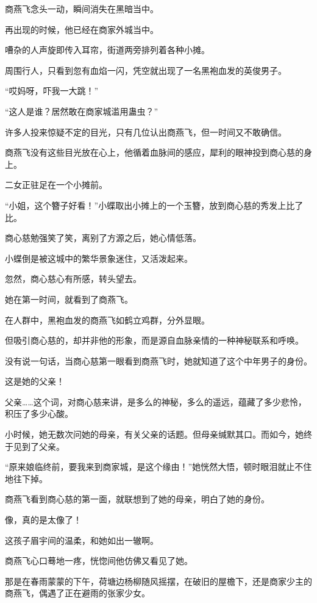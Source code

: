 
\begin{this_body}

商燕飞念头一动，瞬间消失在黑暗当中。

再出现的时候，他已经在商家外城当中。

嘈杂的人声旋即传入耳帘，街道两旁排列着各种小摊。

周围行人，只看到忽有血焰一闪，凭空就出现了一名黑袍血发的英俊男子。

“哎妈呀，吓我一大跳！”

“这人是谁？居然敢在商家城滥用蛊虫？”

许多人投来惊疑不定的目光，只有几位认出商燕飞，但一时间又不敢确信。

商燕飞没有这些目光放在心上，他循着血脉间的感应，犀利的眼神投到商心慈的身上。

二女正驻足在一个小摊前。

“小姐，这个簪子好看！”小蝶取出小摊上的一个玉簪，放到商心慈的秀发上比了比。

商心慈勉强笑了笑，离别了方源之后，她心情低落。

小蝶倒是被这城中的繁华景象迷住，又活泼起来。

忽然，商心慈心有所感，转头望去。

她在第一时间，就看到了商燕飞。

在人群中，黑袍血发的商燕飞如鹤立鸡群，分外显眼。

但吸引商心慈的，却并非他的形象，而是源自血脉亲情的一种神秘联系和呼唤。

没有说一句话，当商心慈第一眼看到商燕飞时，她就知道了这个中年男子的身份。

这是她的父亲！

父亲……这个词，对商心慈来讲，是多么的神秘，多么的遥远，蕴藏了多少悲怜，积压了多少心酸。

小时候，她无数次问她的母亲，有关父亲的话题。但母亲缄默其口。而如今，她终于见到了父亲。

“原来娘临终前，要我来到商家城，是这个缘由！”她恍然大悟，顿时眼泪就止不住地往下掉。

商燕飞看到商心慈的第一面，就联想到了她的母亲，明白了她的身份。

像，真的是太像了！

这孩子眉宇间的温柔，和她如出一辙啊。

商燕飞心口蓦地一疼，恍惚间他仿佛又看见了她。

那是在春雨蒙蒙的下午，荷塘边杨柳随风摇摆，在破旧的屋檐下，还是商家少主的商燕飞，偶遇了正在避雨的张家少女。


\end{this_body}
